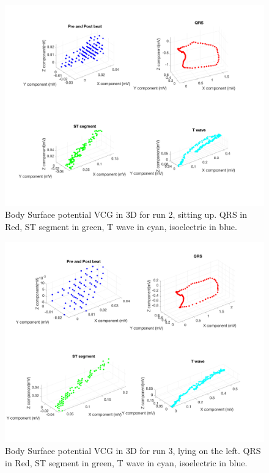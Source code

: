 \documentclass[12pt]{article}
\begin{document}
\begin{figure}[H]
	
	\centering
	\includegraphics[width = .95\textwidth]{Figures/BSP_run2_3d.png}
	\caption{Body Surface potential VCG in 3D for run 2, sitting up. QRS in Red, ST segment in green, T wave in cyan, isoelectric in blue.}
	\label{fig:BSP2}
\end{figure}

\begin{figure}[H]
	
	\centering
	\includegraphics[width = .95\textwidth]{Figures/BSP_run3_3d.png}
	\caption{Body Surface potential VCG in 3D for run 3, lying on the left. QRS in Red, ST segment in green, T wave in cyan, isoelectric in blue. }
	\label{fig:BSP3}
\end{figure}
\end{document}
